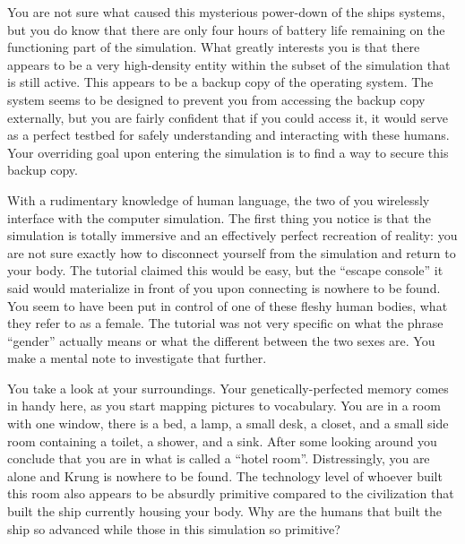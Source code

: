 \documentclass[char]{guildcamp1}
\begin{document}
You are not sure what caused this mysterious power-down of the ships systems, but you do know that there are only four hours of battery life remaining on the functioning part of the simulation. What greatly interests you is that there appears to be a very high-density entity within the subset of the simulation that is still active. This appears to be a backup copy of the operating system. The system seems to be designed to prevent you from accessing the backup copy externally, but you are fairly confident that if you could access it, it would serve as a perfect testbed for safely understanding and interacting with these humans. Your overriding goal upon entering the simulation is to find a way to secure this backup copy.

With a rudimentary knowledge of human language, the two of you wirelessly interface with the computer simulation. The first thing you notice is that the simulation is totally immersive and an effectively perfect recreation of reality: you are not sure exactly how to disconnect yourself from the simulation and return to your body. The tutorial claimed this would be easy, but the ``escape console'' it said would materialize in front of you upon connecting is nowhere to be found. You seem to have been put in control of one of these fleshy human bodies, what they refer to as a female. The tutorial was not very specific on what the phrase ``gender'' actually means or what the different between the two sexes are. You make a mental note to investigate that further.

You take a look at your surroundings. Your genetically-perfected memory comes in handy here, as you start mapping pictures to vocabulary. You are in a room with one window, there is a bed, a lamp, a small desk, a closet, and a small side room containing a toilet, a shower, and a sink. After some looking around you conclude that you are in what is called a ``hotel room''. Distressingly, you are alone and Krung is nowhere to be found. The technology level of whoever built this room also appears to be absurdly primitive compared to the civilization that built the ship currently housing your body. Why are the humans that built the ship so advanced while those in this simulation so primitive?
\end{document}
